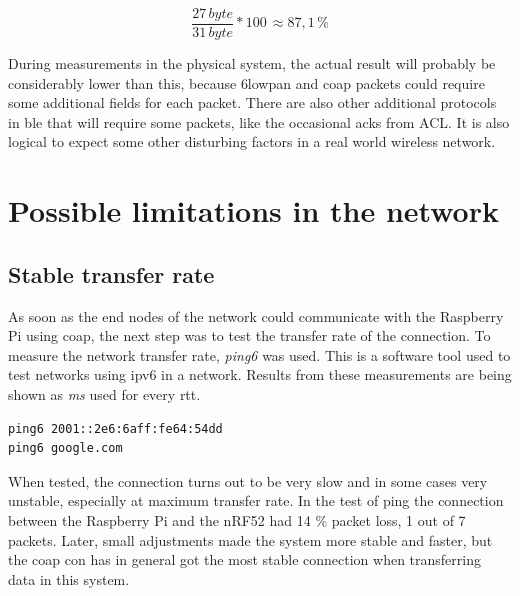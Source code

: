 \begin{equation}
    \frac{27 \, byte}{31 \, byte}*100 \, \approx 87,1 \,\%
\end{equation}


\noindent During measurements in the physical system, the actual result will probably be considerably lower than this, because \gls{6lowpan} and \gls{coap} packets could require some additional fields for each packet. There are also other additional protocols in \gls{ble} that will require some packets, like the occasional \glspl{ack} from ACL. It is also logical to expect some other disturbing factors in a real world wireless network. 

\section{Possible limitations in the network}

\subsection{Stable transfer rate}

As soon as the end nodes of the network could communicate with the Raspberry Pi using \gls{coap}, the next step was to test the transfer rate of the connection. To measure the network transfer rate, \textit{ping6} was used. This is a software tool used to test networks using \gls{ipv6} in a network. Results from these measurements are being shown as \textit{ms} used for every \acrlong{rtt}. 

\begin{verbatim}
ping6 2001::2e6:6aff:fe64:54dd
ping6 google.com
\end{verbatim}


\noindent When tested, the connection turns out to be very slow and in some cases very unstable, especially at maximum transfer rate. In the test of ping the connection between the Raspberry Pi and the nRF52 had 14 \% packet loss, 1 out of 7 packets. Later, small adjustments made the system more stable and faster, but the \gls{coap} \gls{con} has in general got the most stable connection when transferring data in this system.  


